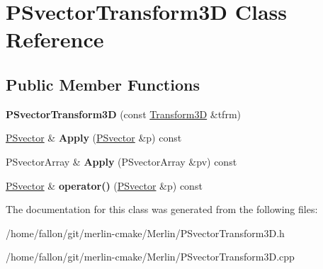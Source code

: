 \hypertarget{classPSvectorTransform3D}{}\section{P\+Svector\+Transform3D Class Reference}
\label{classPSvectorTransform3D}
\subsection*{Public Member Functions}
\begin{DoxyCompactItemize}
\item 
\mbox{\label{classPSvectorTransform3D_ac9690662c64368d18d9a0028e98b7a23}} 
{\bfseries P\+Svector\+Transform3D} (const \hyperlink{classTransform3D}{Transform3D} \&tfrm)
\item 
\mbox{\label{classPSvectorTransform3D_a51b9b5842fcbaff3df035eda35a15ade}} 
\hyperlink{classPSvector}{P\+Svector} \& {\bfseries Apply} (\hyperlink{classPSvector}{P\+Svector} \&p) const
\item 
\mbox{\label{classPSvectorTransform3D_a9136ff2809b7e8e7da0a2eb8c9d218d0}} 
P\+Svector\+Array \& {\bfseries Apply} (P\+Svector\+Array \&pv) const
\item 
\mbox{\label{classPSvectorTransform3D_a28be797ef58256c2c5994607b5e012a9}} 
\hyperlink{classPSvector}{P\+Svector} \& {\bfseries operator()} (\hyperlink{classPSvector}{P\+Svector} \&p) const
\end{DoxyCompactItemize}


The documentation for this class was generated from the following files\+:\begin{DoxyCompactItemize}
\item 
/home/fallon/git/merlin-\/cmake/\+Merlin/P\+Svector\+Transform3\+D.\+h\item 
/home/fallon/git/merlin-\/cmake/\+Merlin/P\+Svector\+Transform3\+D.\+cpp\end{DoxyCompactItemize}
